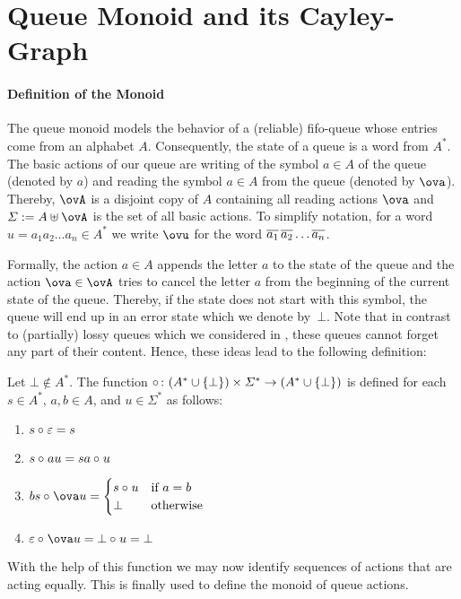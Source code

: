 \section{Queue Monoid and its Cayley-Graph}
\paragraph*{Definition of the Monoid}
The queue monoid models the behavior of a (reliable) fifo-queue whose entries come from an alphabet $A$. Consequently, the state of a queue is a word from $A^*$. The basic actions of our queue are writing of the symbol $a\in A$ of the queue (denoted by $a$) and reading the symbol $a\in A$ from the queue (denoted by $\ova$). Thereby, $\ovA$ is a disjoint copy of $A$ containing all reading actions $\ova$ and $\varSigma:=A\uplus\ovA$ is the set of all basic actions. To simplify notation, for a word $u=a_1a_2\dots a_n\in A^*$ we write $\ovu$ for the word $\overline{a_1}\,\overline{a_2}\dots \overline{a_n}$.

Formally, the action $a\in A$ appends the letter $a$ to the state of the queue and the action $\ova\in\ovA$ tries to cancel the letter $a$ from the beginning of the current state of the queue. Thereby, if the state does not start with this symbol, the queue will end up in an error state which we denote by~$\bot$. Note that in contrast to (partially) lossy queues which we considered in \cite{KKP18,Koe18}, these queues cannot forget any part of their content. Hence, these ideas lead to the following definition:\pagebreak

\begin{definition}
	Let $\bot\notin A^*$. The function $\circ_{}\colon(A^*\cup\{\bot\})\times\varSigma^*\to(A^*\cup\{\bot\})$ is defined for each $s\in A^*$, $a,b\in A$, and $u\in\varSigma^*$ as follows:
	\begin{enumerate}[(1)]
		\item $s\circ_{} \varepsilon=s$
		\item $s\circ_{} au=sa\circ_{} u$
		\item $bs\opx \ova u=\begin{cases}
		s\opx u & \text{if }a=b\\
		\bot & \text{otherwise}
		\end{cases}$
		\item $\varepsilon\opx \ova u=\bot\opx u=\bot$
	\end{enumerate}
\end{definition}

With the help of this function we may now identify sequences of actions that are acting equally. This is finally used to define the monoid of queue actions.

